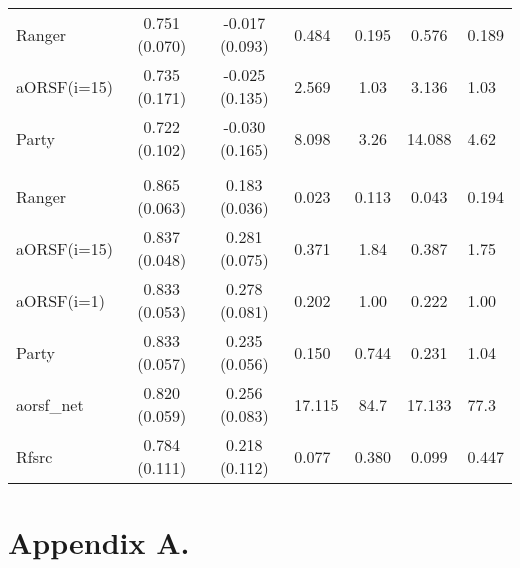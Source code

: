 \documentclass[twoside,11pt]{article}\usepackage[]{graphicx}\usepackage[]{color}
\newenvironment{knitrout}{}{} %
\begin{document}
\begin{knitrout}
\begin{longtable}{lcclccl}
\hspace{1em}Ranger & 0.751 (0.070) & -0.017 (0.093) & 0.484 & 0.195 & 0.576 & 0.189\\
\hspace{1em}aORSF(i=15) & 0.735 (0.171) & -0.025 (0.135) & 2.569 & 1.03 & 3.136 & 1.03\\
\hspace{1em}Party & 0.722 (0.102) & -0.030 (0.165) & 8.098 & 3.26 & 14.088 & 4.62\\
\addlinespace[0.3em]
\hline
\multicolumn{7}{l}{\textit{\textbf{veteran}}}\\
\hline
\hspace{1em}Ranger & 0.865 (0.063) & 0.183 (0.036) & 0.023 & 0.113 & 0.043 & 0.194\\
\hspace{1em}aORSF(i=15) & 0.837 (0.048) & 0.281 (0.075) & 0.371 & 1.84 & 0.387 & 1.75\\
\hspace{1em}aORSF(i=1) & 0.833 (0.053) & 0.278 (0.081) & 0.202 & 1.00 & 0.222 & 1.00\\
\hspace{1em}Party & 0.833 (0.057) & 0.235 (0.056) & 0.150 & 0.744 & 0.231 & 1.04\\
\hspace{1em}aorsf\_net & 0.820 (0.059) & 0.256 (0.083) & 17.115 & 84.7 & 17.133 & 77.3\\
\hspace{1em}Rfsrc & 0.784 (0.111) & 0.218 (0.112) & 0.077 & 0.380 & 0.099 & 0.447\\*
\end{longtable}

\end{knitrout}





\newpage

\appendix
\section*{Appendix A.}
\label{app:theorem}
\end{document}

